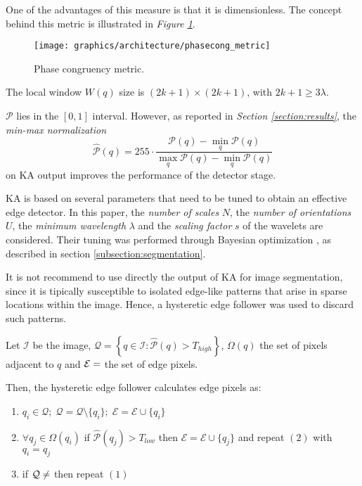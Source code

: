         \par{
            One of the advantages of this measure is that it is dimensionless. The concept behind this metric is illustrated in \emph{Figure \ref{fig:phase-congruency-metric}}.
        }
	    \begin{figure}
	    	\centering
	    	\texttt{[image: graphics/architecture/phasecong\_metric]}
	    	\caption{Phase congruency metric.}
	    	\label{fig:phase-congruency-metric}
	    \end{figure}
	    \par{
	    	The local window $W(q)$ size is $(2k+1)\times(2k+1)$, with $2k+1 \geq 3\lambda$.
		}
        \par{
        	$\mathcal{P}$ lies in the $[0,1]$ interval. However, as reported in \emph{Section \ref{section:results}}, the \emph{min-max normalization}
        	\begin{equation*}
        	\hat{\mathcal{P}}(q) = 255 \cdot \frac{\mathcal{P}(q)-\min_q\mathcal{P}(q)}{\max_q\mathcal{P}(q)-\min_q\mathcal{P}(q)}
        	\end{equation*}
        	 on KA output improves the performance of the detector stage.
        }
        \par{
        	KA is based on several parameters that need to be tuned to obtain an effective edge detector. In this paper, the \emph{number of scales} $N$, the \emph{number of orientations} $U$, the \emph{minimum wavelength} $\lambda$ and the \emph{scaling factor} $s$ of the wavelets are considered. Their tuning was performed through Bayesian optimization \cite{arXiv:2012arXiv1206.2944S,arXiv:2018arXiv180702811F, matlab:bayesian-opt}, as described in section \ref{subsection:segmentation}.
        }
        \par{
            It is not recommend to use directly the output of KA for image segmentation, since it is tipically susceptible to isolated edge-like patterns that arise in sparse locations within the image. Hence, a hysteretic edge follower was used to discard such patterns.
        }
        \par{
            Let $\mathcal{I}$ be the image, $\mathcal{Q} = \left\{q \in \mathcal{I} \colon \hat{\mathcal{P}}(q) > T_{high}\right\}$, $\Omega(q)$ the set of  pixels adjacent to $q$ and $\mathcal{E} = \empty$ the set of edge pixels.
        }
        \par{
            Then, the hysteretic edge follower calculates edge pixels as:
            \begin{enumerate}
    			\item $q_i \in \mathcal{Q};\; \mathcal{Q} = \mathcal{Q} \setminus \{q_i\};\;\mathcal{E} = \mathcal{E} \cup \{q_i\}$
    			\item $\forall q_j \in \Omega(q_i)$ if $\hat{\mathcal{P}}(q_j) > T_{low}$ then $\mathcal{E} = \mathcal{E} \cup \{q_j\}$ and repeat $(2)$ with $q_i = q_j$
    			\item if $\mathcal{Q} \neq \empty$ then repeat $(1)$
    		\end{enumerate}
        }
